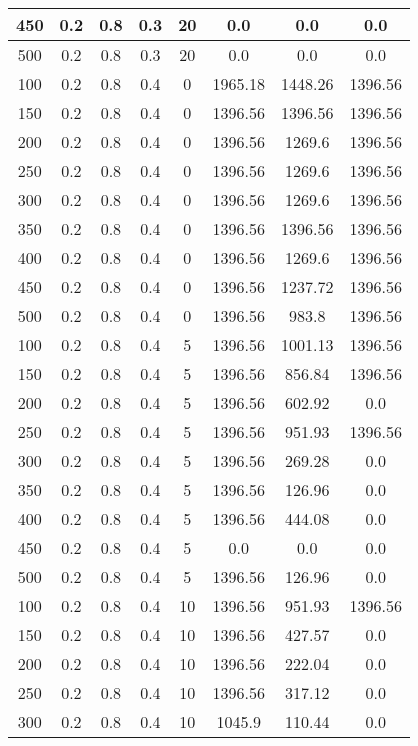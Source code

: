 \documentclass[a4paper, 12pt]{extreport}
\begin{document}
\begin{itemize}
\begin{longtable}{|c|c|c|c|c|c|c|c|}
			450 & 0.2 & 0.8 & 0.3 & 20 & 0.0 & 0.0 & 0.0 \\\hline
			500 & 0.2 & 0.8 & 0.3 & 20 & 0.0 & 0.0 & 0.0 \\\hline
			100 & 0.2 & 0.8 & 0.4 & 0 & 1965.18 & 1448.26 & 1396.56 \\\hline
			150 & 0.2 & 0.8 & 0.4 & 0 & 1396.56 & 1396.56 & 1396.56 \\\hline
			200 & 0.2 & 0.8 & 0.4 & 0 & 1396.56 & 1269.6 & 1396.56 \\\hline
			250 & 0.2 & 0.8 & 0.4 & 0 & 1396.56 & 1269.6 & 1396.56 \\\hline
			300 & 0.2 & 0.8 & 0.4 & 0 & 1396.56 & 1269.6 & 1396.56 \\\hline
			350 & 0.2 & 0.8 & 0.4 & 0 & 1396.56 & 1396.56 & 1396.56 \\\hline
			400 & 0.2 & 0.8 & 0.4 & 0 & 1396.56 & 1269.6 & 1396.56 \\\hline
			450 & 0.2 & 0.8 & 0.4 & 0 & 1396.56 & 1237.72 & 1396.56 \\\hline
			500 & 0.2 & 0.8 & 0.4 & 0 & 1396.56 & 983.8 & 1396.56 \\\hline
			100 & 0.2 & 0.8 & 0.4 & 5 & 1396.56 & 1001.13 & 1396.56 \\\hline
			150 & 0.2 & 0.8 & 0.4 & 5 & 1396.56 & 856.84 & 1396.56 \\\hline
			200 & 0.2 & 0.8 & 0.4 & 5 & 1396.56 & 602.92 & 0.0 \\\hline
			250 & 0.2 & 0.8 & 0.4 & 5 & 1396.56 & 951.93 & 1396.56 \\\hline
			300 & 0.2 & 0.8 & 0.4 & 5 & 1396.56 & 269.28 & 0.0 \\\hline
			350 & 0.2 & 0.8 & 0.4 & 5 & 1396.56 & 126.96 & 0.0 \\\hline
			400 & 0.2 & 0.8 & 0.4 & 5 & 1396.56 & 444.08 & 0.0 \\\hline
			450 & 0.2 & 0.8 & 0.4 & 5 & 0.0 & 0.0 & 0.0 \\\hline
			500 & 0.2 & 0.8 & 0.4 & 5 & 1396.56 & 126.96 & 0.0 \\\hline
			100 & 0.2 & 0.8 & 0.4 & 10 & 1396.56 & 951.93 & 1396.56 \\\hline
			150 & 0.2 & 0.8 & 0.4 & 10 & 1396.56 & 427.57 & 0.0 \\\hline
			200 & 0.2 & 0.8 & 0.4 & 10 & 1396.56 & 222.04 & 0.0 \\\hline
			250 & 0.2 & 0.8 & 0.4 & 10 & 1396.56 & 317.12 & 0.0 \\\hline
			300 & 0.2 & 0.8 & 0.4 & 10 & 1045.9 & 110.44 & 0.0 \\\hline

\end{longtable}
\end{itemize}
\end{document}

